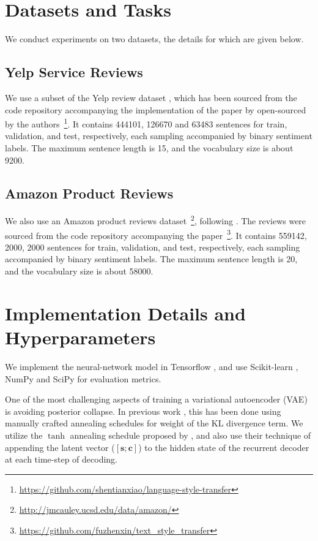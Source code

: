 \section{Datasets and Tasks} \label{sec:datasets-tasks}

We conduct experiments on two datasets, the details for which are given below.

\subsection{Yelp Service Reviews}

We use a subset of the Yelp review dataset \citep{challenge2013yelp}, which has been sourced from the code repository accompanying the implementation of the paper by \cite{shen2017style} open-sourced by the authors~\footnote{\url{https://github.com/shentianxiao/language-style-transfer}}. It contains 444101, 126670 and 63483 sentences for train, validation, and test, respectively, each sampling accompanied by binary sentiment labels. The maximum sentence length is 15, and the vocabulary size is about 9200.

\subsection{Amazon Product Reviews}

We also use an Amazon product reviews dataset~\footnote{\url{http://jmcauley.ucsd.edu/data/amazon/}}, following \cite{fu2017style}. The reviews were sourced from the code repository accompanying the paper~\footnote{\url{https://github.com/fuzhenxin/text_style_transfer}}. It contains 559142, 2000, 2000 sentences for train, validation, and test, respectively, each sampling accompanied by binary sentiment labels. The maximum sentence length is 20, and the vocabulary size is about 58000.


\section{Implementation Details and Hyperparameters}

We implement the neural-network model in Tensorflow \citep{abadi2016tensorflow}, and use Scikit-learn \citep{pedregosa2011scikit}, NumPy and SciPy for evaluation metrics.

One of the most challenging aspects of training a variational autoencoder (VAE) is avoiding posterior collapse. In previous work \citep{yang2017improved, bowman2016generating, bahuleyan2017variational}, this has been done using manually crafted annealing schedules for weight of the KL divergence term. We utilize the $\tanh$ annealing schedule proposed by \cite{bahuleyan2017variational}, and also use their technique of appending the latent vector ($[\bm s; \bm c]$) to the hidden state of the recurrent decoder at each time-step of decoding.

